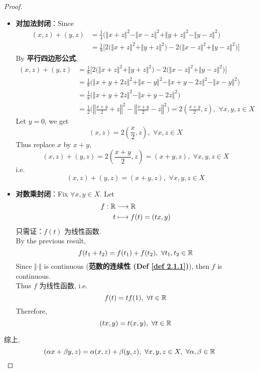 \begin{thm}
\begin{proof}
			\begin{itemize}
				\item \textbf{对加法封闭}：Since
				\begin{align}
					(x , z) + (y , z) 
					&= \frac{1}{4} \Big( \Vert x + z \Vert^2 - \Vert x - z \Vert^2 + \Vert y + z \Vert^2 - \Vert y - z \Vert^2 \Big) \\
					&= \frac{1}{8} \Big[ 2 \Big( \Vert x + z \Vert^2 + \Vert y + z \Vert^2 \Big) - 2 \Big( \Vert x - z \Vert^2 + \Vert y - z \Vert^2 \Big) \Big]
				\end{align}
				By \textbf{平行四边形公式}, 
				\begin{align}
					(x , z) + (y , z) 
					&= \frac{1}{8} \Big[ 2 \Big( \Vert x + z \Vert^2 + \Vert y + z \Vert^2 \Big) - 2 \Big( \Vert x - z \Vert^2 + \Vert y - z \Vert^2 \Big) \Big] \\
					&= \frac{1}{8} \Big( \Vert x + y + 2z \Vert^2 + \Vert x - y \Vert^2 - \Vert x + y - 2z \Vert^2 - \Vert x - y \Vert^2 \Big) \\ 
					&= \frac{1}{8} \Big( \Vert x + y + 2z \Vert^2 - \Vert x + y - 2z \Vert^2 \Big) \\
					&= \frac{1}{2} \Big( \left\Vert \frac{x + y}{2} + z \right\Vert^2 - \left\Vert \frac{x + y}{2} - z \right\Vert^2 \Big) 
					= 2 \left( \frac{x + y}{2} , z \right) , \,\, \forall x , y , z \in X
				\end{align}
				Let $y = 0$, we get
				\[ (x , z) = 2 \left( \frac{x}{2} , z \right) , \,\, \forall x , z \in X \]
				Thus replace $x$ by $x + y$, 
				\[ (x , z) + (y , z) = 2 \left( \frac{x + y}{2} , z \right) = (x + y , z) , \,\, \forall x , y , z \in X \]
				i.e. 
				\[ (x , z) + (y , z) = (x + y , z) , \,\, \forall x , y , z \in X \]
				
				\newpage
				
				\item \textbf{对数乘封闭}：Fix $\forall x , y \in X$. Let
				\begin{align}
					f : \mathbb{R} &\longrightarrow \mathbb{R} \\
					t &\longmapsto f(t) = (tx , y)
				\end{align}
				只需证：$f(t)$ 为线性函数. \\
				By the previous result, 
				\[ f(t_1 + t_2) = f(t_1) + f(t_2) , \,\, \forall t_1 , t_2 \in \mathbb{R} \]
				Since $\Vert \cdot \Vert$ is continuous (\textbf{范数的连续性 (Def \ref{def 2.1.1})}), then $f$ is continuous. \\
				Thus $f$ 为线性函数, i.e.
				\[ f(t) = tf(1) , \,\, \forall t \in \mathbb{R} \]
				Therefore, 
				\[ (tx , y) = t(x , y) , \,\, \forall t \in \mathbb{R} \]
			\end{itemize}
			
			综上, 
			\[ (\alpha x + \beta y , z) = \alpha (x , z) + \beta (y , z) , \,\, \forall x , y , z \in X , \,\, \forall \alpha , \beta \in \mathbb{R} \]
		\end{proof}
	\end{thm}

